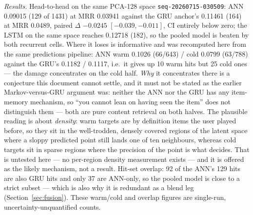 \documentclass[11pt]{article}
\newcommand{\dsid}[1]{\texttt{\small #1}}
\begin{document}
\emph{Results.} Head-to-head on the same PCA-128 space
\dsid{seq-20260715-030509}: ANN \num{0.09015} (\num{129} of \num{1431}) at MRR
\num{0.03941} against the GRU anchor's \num{0.11461} (\num{164}) at MRR
\num{0.0489}, paired $\Delta$ $-\num{0.0245}$
$[-\num{0.039},-\num{0.011}]$, CI entirely below zero; the LSTM on the same
space reaches \num{0.12718} (\num{182}), so the pooled model is beaten by both
recurrent cells. Where it loses is informative and was recomputed here from the
same predictions pipeline: ANN warm \num{0.1026} (\num{66}/\num{643}) / cold
\num{0.0799} (\num{63}/\num{788}) against the GRU's \num{0.1182} / \num{0.1117},
i.e.\ it gives up \num{10} warm hits but \num{25} cold ones --- the damage
concentrates on the cold half. \emph{Why} it concentrates there is a conjecture
this document cannot settle, and it must not be stated as the earlier
Markov-versus-GRU argument was: neither the ANN nor the GRU has any item-memory
mechanism, so ``you cannot lean on having seen the item'' does not distinguish
them --- both are pure content retrieval on both halves. The plausible reading is
about \emph{density}: warm targets are by definition items the user played
before, so they sit in the well-trodden, densely covered regions of the latent
space where a sloppy predicted point still lands one of ten neighbours, whereas
cold targets sit in sparse regions where the precision of the point is what
decides. That is untested here --- no per-region density measurement exists ---
and it is offered as the likely mechanism, not a result. Hit-set
overlap: \num{92} of the ANN's \num{129} hits are also GRU hits and only
\num{37} are ANN-only, so the pooled model is close to a strict subset --- which
is also why it is redundant as a blend leg (Section~\ref{sec:fusion}). These
warm/cold and overlap figures are single-run, uncertainty-unquantified counts.
\end{document}
